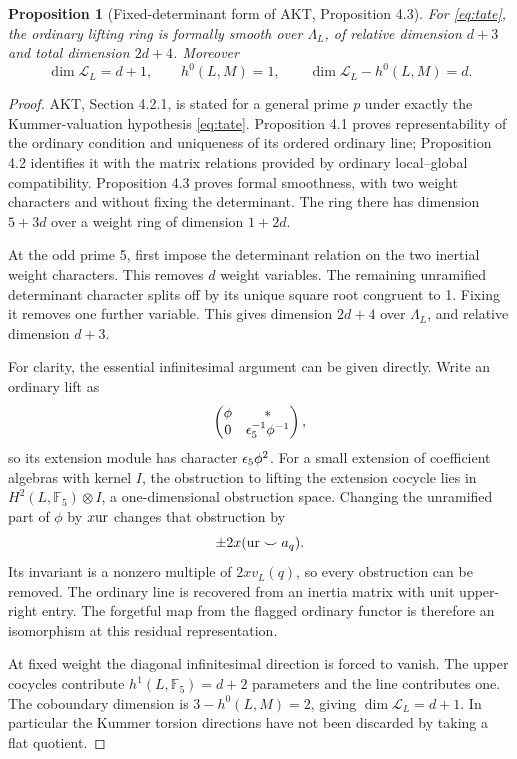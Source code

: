 \documentclass[11pt,a4paper]{article}
\newtheorem{proposition}[theorem]{Proposition}
\theoremstyle{definition}\newtheorem{definition}[theorem]{Definition}
\theoremstyle{remark}\newtheorem*{remark}{Remark}
\newcommand{\F}{\mathbb F}\newcommand{\OO}{\mathcal O}
\begin{document}
\begin{proposition}[Fixed-determinant form of AKT, Proposition 4.3]
\label{prop:smooth}
For \eqref{eq:tate}, the ordinary lifting ring is formally smooth over
$\Lambda_L$, of relative dimension $d+3$ and total dimension $2d+4$.
Moreover
\[
 \dim\mathcal L_L=d+1,\qquad h^0(L,M)=1,
 \qquad \dim\mathcal L_L-h^0(L,M)=d.
\]
\end{proposition}
\begin{proof}
AKT, Section 4.2.1, is stated for a general prime $p$ under exactly the
Kummer-valuation hypothesis \eqref{eq:tate}. Proposition 4.1 proves
representability of the ordinary condition and uniqueness of its ordered
ordinary line; Proposition 4.2 identifies it with the matrix relations provided
by ordinary local--global compatibility. Proposition 4.3 proves formal
smoothness, with two weight characters and without fixing the determinant.
The ring there has dimension $5+3d$ over a weight ring of dimension $1+2d$.

At the odd prime 5, first impose the determinant relation on the two inertial
weight characters. This removes $d$ weight variables. The remaining unramified
determinant character splits off by its unique square root congruent to 1.
Fixing it removes one further variable. This gives dimension $2d+4$ over
$\Lambda_L$, and relative dimension $d+3$.

For clarity, the essential infinitesimal argument can be given directly.
Write an ordinary lift as
\[
 \begin{pmatrix}\phi&*\\0&\epsilon_5^{-1}\phi^{-1}\end{pmatrix},
\]
so its extension module has character $\epsilon_5\phi^2$. For a small extension
of coefficient algebras with kernel $I$, the obstruction to lifting the
extension cocycle lies in $H^2(L,\F_5)\otimes I$, a one-dimensional
obstruction space. Changing the unramified part of $\phi$ by $x\mathrm{ur}$
changes that obstruction by
\[
 \pm2x(\mathrm{ur}\smile a_q).
\]
Its invariant is a nonzero multiple of $2xv_L(q)$, so every obstruction can
be removed. The ordinary line is recovered from an inertia matrix with unit
upper-right entry. The forgetful map from the flagged ordinary functor is
therefore an isomorphism at this residual representation.

At fixed weight the diagonal infinitesimal direction is forced to vanish.
The upper cocycles contribute $h^1(L,\F_5)=d+2$ parameters and the line
contributes one. The coboundary dimension is $3-h^0(L,M)=2$, giving
$\dim\mathcal L_L=d+1$. In particular the Kummer torsion directions have
not been discarded by taking a flat quotient.
\end{proof}
\end{document}
